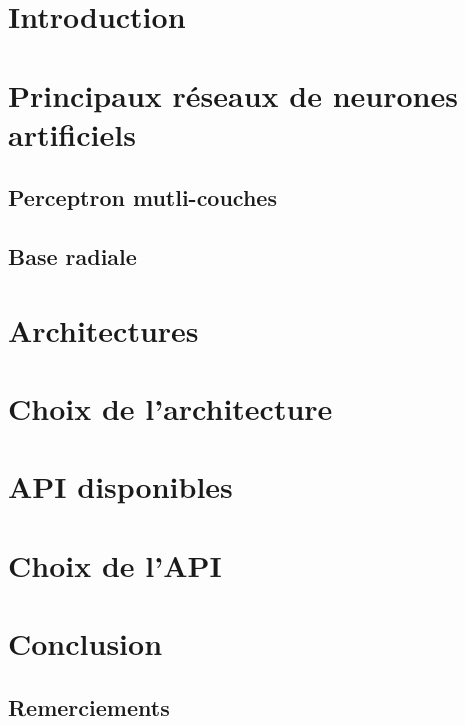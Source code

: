 \documentclass[12pt,a4paper,oneside, titlepage]{article}
\begin{document}

\tableofcontents
\section{Introduction}
\section{Principaux réseaux de neurones artificiels}
\subsection{Perceptron mutli-couches}
\subsection{Base radiale}
\section{Architectures}
\section{Choix de l'architecture}
\section{API disponibles}
\section{Choix de l'API}
\section{Conclusion}
\subsection*{Remerciements}


\end{document}
